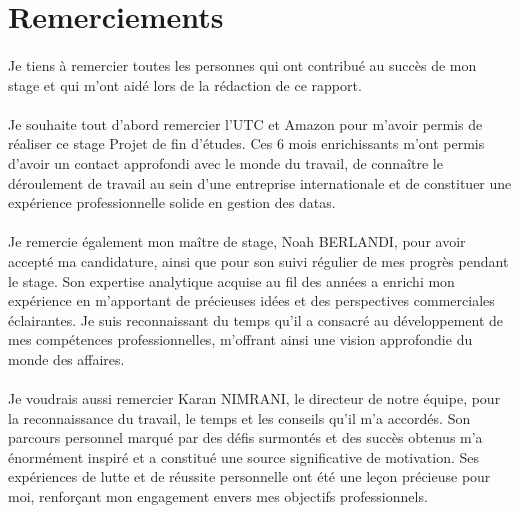 \section*{Remerciements}
\paragraph{}
\vspace{-2em}  %
Je tiens à remercier toutes les personnes qui ont contribué au succès de mon stage et qui
m'ont aidé lors de la rédaction de ce rapport.
\vspace{-2em}  %
\paragraph{}
Je souhaite tout d'abord remercier l'UTC et Amazon pour m'avoir permis de
réaliser ce stage Projet de fin d'études. Ces 6 mois enrichissants m'ont permis
d'avoir un contact approfondi avec le monde du travail, de connaître le déroulement de travail au sein d'une entreprise internationale et de constituer une
expérience professionnelle solide en gestion des datas.
\vspace{-2em}  %
\paragraph{}
Je remercie également mon maître de stage, Noah BERLANDI, pour avoir accepté ma candidature, ainsi que pour son suivi régulier de mes progrès pendant le stage. 
Son expertise analytique acquise au fil des années a enrichi mon expérience en m'apportant de précieuses idées et des perspectives commerciales éclairantes. Je suis reconnaissant du temps qu'il a consacré au développement de mes compétences professionnelles, m'offrant ainsi une vision approfondie du monde des affaires.
\vspace{-2em}  %
\paragraph{}
Je voudrais aussi remercier Karan NIMRANI, le directeur de notre équipe, pour la reconnaissance du travail, le temps et les conseils qu'il m'a accordés. Son parcours personnel marqué par des défis surmontés et des succès obtenus m'a énormément inspiré et a constitué une source significative de motivation. Ses expériences de lutte et de réussite personnelle ont été une leçon précieuse pour moi, renforçant mon engagement envers mes objectifs professionnels.
\vspace{-2em}  %
